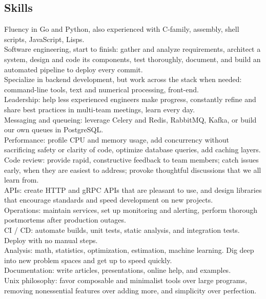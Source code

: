 \documentclass[12pt]{report}
\makeatletter
\renewcommand{\bullet}{$\vcenter{\hbox{~\huge$\cdot$~}}$}
\newenvironment{bullets}
{\tabularx{\textwidth}{ @{\bullet} X @{} }}
{\endtabularx}
\makeatother
\begin{document}
\subsection*{Skills}
\begin{bullets}
Fluency in Go and Python, also experienced with C-family, assembly, shell scripts, JavaScript, Lisps. \\
Software engineering, start to finish: gather and analyze requirements, architect a system, design and code its components, test thoroughly, document, and build an automated pipeline to deploy every commit. \\
Specialize in backend development, but work across the stack when needed: command-line tools, text and numerical processing, front-end. \\
Leadership: help less experienced engineers make progress, constantly refine and share best practices in multi-team meetings, learn every day. \\
Messaging and queueing: leverage Celery and Redis, RabbitMQ, Kafka, or build our own queues in PostgreSQL. \\
Performance: profile CPU and memory usage, add concurrency without sacrificing safety or clarity of code, optimize database queries, add caching layers. \\
Code review: provide rapid, constructive feedback to team members; catch issues early, when they are easiest to address; provoke thoughtful discussions that we all learn from. \\
APIs: create HTTP and gRPC APIs that are pleasant to use, and design libraries that encourage standards and speed development on new projects. \\
Operations: maintain services, set up monitoring and alerting, perform thorough postmortems after production outages. \\
CI / CD: automate builds, unit tests, static analysis, and integration tests. Deploy with no manual steps. \\ 
Analysis: math, statistics, optimization, estimation, machine learning. Dig deep into new problem spaces and get up to speed quickly. \\
Documentation: write articles, presentations, online help, and examples. \\
Unix philosophy: favor composable and minimalist tools over large programs, removing nonessential features over adding more, and simplicity over perfection. \\
\end{bullets}
\end{document}
